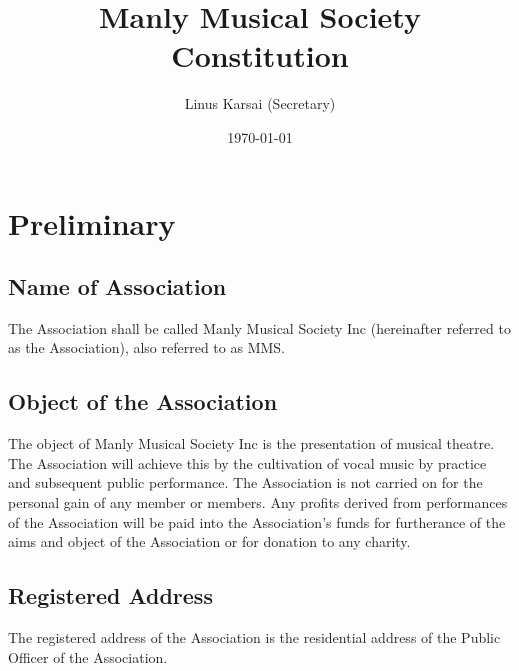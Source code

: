 \documentclass{article}
\title{Manly Musical Society Constitution}
\author{Linus Karsai (Secretary)}
\date{\today}
\begin{document}
\maketitle

\tableofcontents
\clearpage
\section{Preliminary}

\subsection{Name of Association}
The Association shall be called Manly Musical Society Inc (hereinafter referred to as the Association), also referred to as MMS.
\subsection{Object of the Association}
The object of Manly Musical Society Inc is the presentation of musical theatre.  The Association will achieve this by the cultivation of vocal music by practice and subsequent public performance.  The Association is not carried on for the personal gain of any member or members.  Any profits derived from performances of the Association will be paid into the Association’s funds for furtherance of the aims and object of the Association or for donation to any charity.
\subsection{Registered Address}
The registered address of the Association is the residential address of the Public Officer of the Association.
\end{document}
